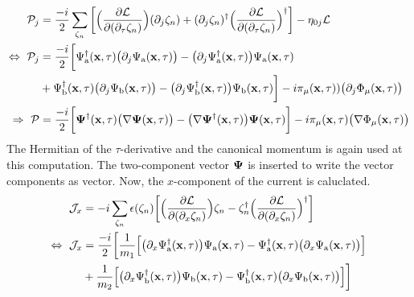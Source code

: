 \begin{align}
	\mathcal{P}_{j} &= 
		\frac{-i}{2} \sum\limits_{\zeta_{n}} \bigg[ 
		\Big(\frac{\partial\mathcal{L}}{\partial(\partial_{\tau}\zeta_{n})}\Big) (\partial_{j}\zeta_{n}) 
		+
		(\partial_{j}\zeta_{n})^{\dag} \Big(\frac{\partial\mathcal{L}}{\partial(\partial_{\tau}\zeta_{n})}\Big)^{\dag}
		\bigg]
		-
		\eta_{0j}\mathcal{L}
		\notag \\
	\Leftrightarrow\ \mathcal{P}_{j} &= 
		\frac{-i}{2} \bigg[
			\Psi_{\mathrm{a}}^{\dag}(\vb{x},\tau) \big(\partial_{j} \Psi_{\mathrm{a}}(\vb{x},\tau)\big)
			- 
			\big(\partial_{j} \Psi_{\mathrm{a}}^{\dag}(\vb{x},\tau)\big) \Psi_{\mathrm{a}}(\vb{x},\tau)
			\notag \\&
			+
			\Psi_{\mathrm{b}}^{\dag}(\vb{x},\tau) \big(\partial_{j} \Psi_{\mathrm{b}}(\vb{x},\tau)\big)
			- 
			\big(\partial_{j} \Psi_{\mathrm{b}}^{\dag}(\vb{x},\tau)\big) \Psi_{\mathrm{b}}(\vb{x},\tau)
		\bigg]
		- 
		i\pi_{\mu}(\vb{x},\tau)) \big(\partial_{j} \Phi_{\mu}(\vb{x},\tau)\big)
	\notag \\
	\Rightarrow\ \vb{\mathcal{P}} &= 
		\frac{-i}{2} \bigg[
			\vb{\Psi}^{\dag}(\vb{x},\tau) \big(\nabla \vb{\Psi}(\vb{x},\tau)\big)
			- 
			\big(\nabla \vb{\Psi}^{\dag}(\vb{x},\tau)\big) \vb{\Psi}(\vb{x},\tau)
		\bigg]
		-
		i \pi_{\mu}(\vb{x},\tau) \big(\nabla \Phi_{\mu}(\vb{x},\tau)\big)
\end{align}
%
The Hermitian of the $\tau$-derivative and the canonical momentum is again used at this computation.
The two-component vector $\vb{\Psi}$ is inserted to write the vector components as vector.
Now, the $x$-component of the current is caluclated.
%
\begin{align}
	\mathcal{J}_{x} &= 
		-i \sum\limits_{\zeta_{n}} \epsilon(\zeta_{n}) \bigg[
			\Big(\frac{\partial\mathcal{L}}{\partial(\partial_{x}\zeta_{n})}\Big) \zeta_{n}
			-
			\zeta_{n}^{\dag} \Big(\frac{\partial\mathcal{L}}{\partial(\partial_{x}\zeta_{n})}\Big)^{\dag}
		\bigg]
	\notag \\
	\Leftrightarrow\ \mathcal{J}_{x} &=
		\frac{-i}{2} \bigg[
		\frac{1}{m_{1}} \Big[
			\big(\partial_{x} \Psi_{\mathrm{a}}^{\dag}(\vb{x},\tau)\big) \Psi_{\mathrm{a}}(\vb{x},\tau)
			-
			\Psi_{\mathrm{a}}^{\dag}(\vb{x},\tau) \big(\partial_{x} \Psi_{\mathrm{a}}(\vb{x},\tau)\big)
		\Big]
		\notag \\&
		+
		\frac{1}{m_{2}} \Big[
			\big(\partial_{x} \Psi_{\mathrm{b}}^{\dag}(\vb{x},\tau)\big) \Psi_{\mathrm{b}}(\vb{x},\tau)
			-
			\Psi_{\mathrm{b}}^{\dag}(\vb{x},\tau) \big(\partial_{x} \Psi_{\mathrm{b}}(\vb{x},\tau)\big)
		\Big]
		\bigg]
\end{align}
